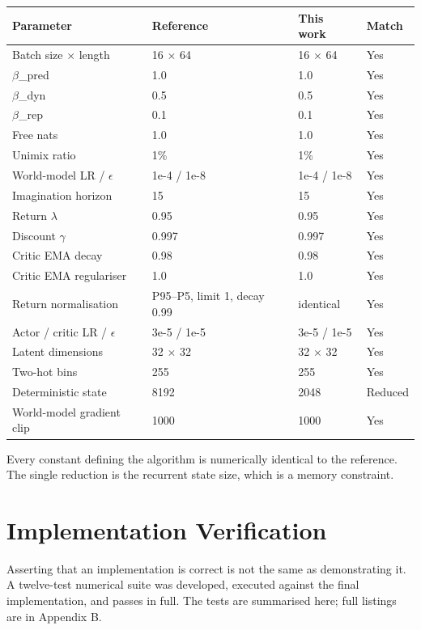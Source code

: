\documentclass[12pt,a4paper,oneside]{report}
\begin{document}
\begin{longtable}[]{@{}llll@{}}
\toprule\noalign{}
Parameter & Reference & This work & Match \\
\midrule\noalign{}
\endhead
\bottomrule\noalign{}
\endlastfoot
Batch size $\times$ length & 16 $\times$ 64 & 16 $\times$ 64 & Yes \\
$\beta$\_pred & 1.0 & 1.0 & Yes \\
$\beta$\_dyn & 0.5 & 0.5 & Yes \\
$\beta$\_rep & 0.1 & 0.1 & Yes \\
Free nats & 1.0 & 1.0 & Yes \\
Unimix ratio & 1\% & 1\% & Yes \\
World-model LR / $\epsilon$ & 1e-4 / 1e-8 & 1e-4 / 1e-8 & Yes \\
Imagination horizon & 15 & 15 & Yes \\
Return $\lambda$ & 0.95 & 0.95 & Yes \\
Discount $\gamma$ & 0.997 & 0.997 & Yes \\
Critic EMA decay & 0.98 & 0.98 & Yes \\
Critic EMA regulariser & 1.0 & 1.0 & Yes \\
Return normalisation & P95--P5, limit 1, decay 0.99 & identical & Yes \\
Actor / critic LR / $\epsilon$ & 3e-5 / 1e-5 & 3e-5 / 1e-5 & Yes \\
Latent dimensions & 32 $\times$ 32 & 32 $\times$ 32 & Yes \\
Two-hot bins & 255 & 255 & Yes \\
Deterministic state & 8192 & 2048 & Reduced \\
World-model gradient clip & 1000 & 1000 & Yes \\
\end{longtable}

Every constant defining the algorithm is numerically identical to the reference.
The single reduction is the recurrent state size, which is a memory constraint.

\hypertarget{implementation-verification}{%
\section{Implementation Verification}\label{implementation-verification}}

Asserting that an implementation is correct is not the same as demonstrating it.
A twelve-test numerical suite was developed, executed against the final
implementation, and passes in full. The tests are summarised here; full listings
are in Appendix B.
\end{document}
